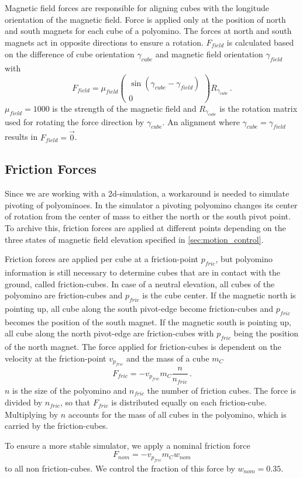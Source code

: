 Magnetic field forces are responsible for aligning cubes with the longitude orientation of the magnetic field.
Force is applied only at the position of north and south magnets for each cube of a polyomino.
The forces at north and south magnets act in opposite directions to ensure a rotation.
$F_\textit{field}$ is calculated based on the difference of cube orientation $\gamma_\textit{cube}$ and magnetic field orientation $\gamma_\textit{field}$ with
\begin{equation}
F_\textit{field} = \mu_\textit{field} \begin{pmatrix} \sin(\gamma_\textit{cube} - \gamma_\textit{field}) \\ 0 \end{pmatrix} R_{\gamma_\textit{cube}} \, .
\end{equation}
$\mu_\textit{field} = 1000$ is the strength of the magnetic field and $R_{\gamma_\textit{cube}}$ is the rotation matrix used for rotating the force direction by $\gamma_\textit{cube}$.
An alignment where $\gamma_\textit{cube} = \gamma_\textit{field}$ results in $F_\textit{field} = \vec{0}$.


\subsection{Friction Forces}
\label{sec:force_friction}

Since we are working with a 2d-simulation, a workaround is needed to simulate pivoting of polyominoes.
In the simulator a pivoting polyomino changes its center of rotation from the center of mass to either the north or the south pivot point.
To archive this, friction forces are applied at different points depending on the three states of magnetic field elevation specified in \autoref{sec:motion_control}.

Friction forces are applied per cube at a friction-point $p_\textit{fric}$, but polyomino information is still necessary to determine cubes that are in contact with the ground, called friction-cubes.
In case of a neutral elevation, all cubes of the polyomino are friction-cubes and $p_\textit{fric}$ is the cube center.
If the magnetic north is pointing up, all cube along the south pivot-edge become friction-cubes and $p_\textit{fric}$ becomes the position of the south magnet.
If the magnetic south is pointing up, all cube along the north pivot-edge are friction-cubes with $p_\textit{fric}$ being the position of the north magnet.
The force applied for friction-cubes is dependent on the velocity at the friction-point $v_{p_\textit{fric}}$ and the mass of a cube $m_C$
\begin{equation}
F_\textit{fric} = -v_{p_\textit{fric}} m_C \frac{n}{n_\textit{fric}} \, .
\end{equation}
$n$ is the size of the polyomino and $n_\textit{fric}$ the number of friction cubes.
The force is divided by $n_\textit{fric}$, so that $F_\textit{fric}$ is distributed equally on each friction-cube.
Multiplying by $n$ accounts for the mass of all cubes in the polyomino, which is carried by the friction-cubes.

To ensure a more stable simulator, we apply a nominal friction force
\begin{equation}
F_\textit{nom} = -v_{p_\textit{fric}} m_C w_\textit{nom}
\end{equation}
to all non friction-cubes.
We control the fraction of this force by $w_\textit{nom} = 0.35$.


